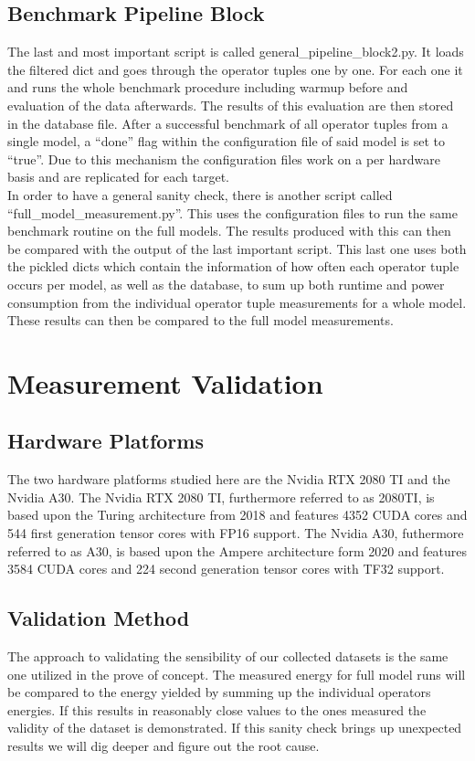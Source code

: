 \documentclass[conference]{IEEEtran}
\begin{document}
\subsection{Benchmark Pipeline Block}
The last and most important script is called general\_pipeline\_block2.py. It loads the filtered dict and goes through the operator tuples one by one. For each one it and runs the whole benchmark procedure including warmup before and evaluation of the data afterwards. The results of this evaluation are then stored in the database file. After a successful benchmark of all operator tuples from a single model, a “done” flag within the configuration file of said model is set to “true”. Due to this mechanism the configuration files work on a per hardware basis and are replicated for each target. \\
In order to have a general sanity check, there is another script called “full\_model\_measurement.py”. This uses the configuration files to run the same benchmark routine on the full models. The results produced with this can then be compared with the output of the last important script. This last one uses both the pickled dicts which contain the information of how often each operator tuple occurs per model, as well as the database, to sum up both runtime and power consumption from the individual operator tuple measurements for a whole model. These results can then be compared to the full model measurements.


\section{Measurement Validation}

\subsection{Hardware Platforms}
The two hardware platforms studied here are the Nvidia RTX 2080 TI and the Nvidia A30. The Nvidia RTX 2080 TI, furthermore referred to as 2080TI, is based upon the Turing architecture from 2018 and features 4352 CUDA cores and 544 first generation tensor cores with FP16 support. The Nvidia A30, futhermore referred to as A30, is based upon the Ampere architecture form 2020 and features 3584 CUDA cores and 224 second generation tensor cores with TF32 support.\\

\subsection{Validation Method}
The approach to validating the sensibility of our collected datasets is the same one utilized in the prove of concept. The measured energy for full model runs will be compared to the energy yielded by summing up the individual operators energies. If this results in reasonably close values to the ones measured the validity of the dataset is demonstrated. If this sanity check brings up unexpected results we will dig deeper and figure out the root cause.
\end{document}
